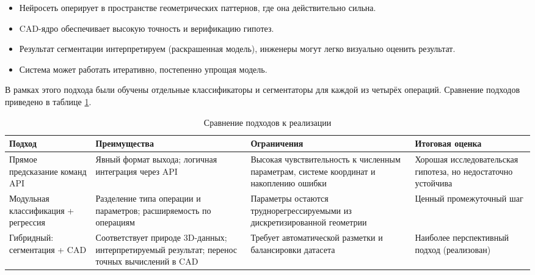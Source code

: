 \begin{itemize}
    \item Нейросеть оперирует в пространстве геометрических паттернов, где она действительно сильна.
    \item CAD-ядро обеспечивает высокую точность и верификацию гипотез.
    \item Результат сегментации интерпретируем (раскрашенная модель), инженеры могут легко визуально оценить результат.
    \item Система может работать итеративно, постепенно упрощая модель.
\end{itemize}

В рамках этого подхода были обучены отдельные классификаторы и сегментаторы для каждой из четырёх операций. Сравнение подходов приведено в таблице \ref{tab:approach-comparison}.

\begin{table}[h]
\centering
\begin{tabular}{|p{4cm}|p{4cm}|p{4cm}|p{3cm}|}
\hline
\textbf{Подход} & \textbf{Преимущества} & \textbf{Ограничения} & \textbf{Итоговая оценка} \\
\hline
Прямое предсказание команд API & Явный формат выхода; логичная интеграция через API & Высокая чувствительность к численным параметрам, системе координат и накоплению ошибки & Хорошая исследовательская гипотеза, но недостаточно устойчива \\
\hline
Модульная классификация + регрессия & Разделение типа операции и параметров; расширяемость по операциям & Параметры остаются труднорегрессируемыми из дискретизированной геометрии & Ценный промежуточный шаг \\
\hline
Гибридный: сегментация + CAD & Соответствует природе 3D-данных; интерпретируемый результат; перенос точных вычислений в CAD & Требует автоматической разметки и балансировки датасета & Наиболее перспективный подход (реализован) \\
\hline
\end{tabular}
\caption{Сравнение подходов к реализации}
\label{tab:approach-comparison}
\end{table}


